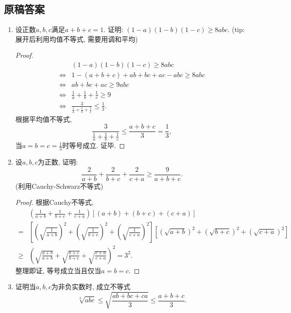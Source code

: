 \documentclass[UTF8,11pt, a4paper, oneside, fontset=none]{ctexbook}
\begin{document}
\subsection*{原稿答案}
\begin{enumerate}

\item 设正数$a, b, c$满足$a + b + c =1$. 证明: $(1-a)(1-b)(1-c) \geq 8abc$. (tip: 展开后利用均值不等式, 需要用调和平均)

\begin{proof}

\begin{align*}
& (1-a)(1-b)(1-c) \geq 8abc \\
\Leftrightarrow & 1 - (a + b + c) + ab + bc + ac - abc \geq 8abc\\
\Leftrightarrow & ab + bc + ac  \geq 9abc\\
\Leftrightarrow & \frac{1}{a} + \frac{1}{b} + \frac{1}{c} \geq 9\\
\Leftrightarrow & \frac{3}{ \frac{1}{a} + \frac{1}{b} + \frac{1}{c}} \leq \frac{1}{3}.
\end{align*}
根据平均值不等式,
\[
\frac{3}{ \frac{1}{a} + \frac{1}{b} + \frac{1}{c}} \leq \frac{a + b + c}{3} = \frac{1}{3},
\]
当$a = b = c =\frac{1}{3}$时等号成立. 证毕.

\end{proof}

\item 设$a, b, c$为正数, 证明:
\[
\frac{2}{a + b} + \frac{2}{b + c} + \frac{2}{c + a} \geq \frac{9}{a + b + c}.
\]
(利用Cauchy-Schwarz不等式)

\begin{proof}

根据Cauchy不等式, 
\begin{align*}
& \left( \frac{1}{a + b} + \frac{1}{b + c} + \frac{1}{c + a} \right)[(a+b) + (b+c) + (c+a)] \\
= &  \left[ \left(\sqrt{ \frac{1}{a + b}}\right)^2 + \left(\sqrt{ \frac{1}{b + c}}\right)^2 + \left(\sqrt{ \frac{1}{c + a}}\right)^2 \right]  [(\sqrt{a+b})^2 + (\sqrt{b+c})^2 + (\sqrt{c+a})^2] \\
\geq & \left( \sqrt{\frac{a+b}{a+b}} + \sqrt{\frac{b+c}{b+c}} + \sqrt{\frac{c+a}{c+a}} \right)^2 = 3^2.
\end{align*}
整理即证, 等号成立当且仅当$a = b = c$.

\end{proof}

\item 证明当$a, b, c$为非负实数时, 成立不等式
\[
\sqrt[3]{abc} \leq \sqrt{\frac{ab + bc + ca}{3}} \leq \frac{a+b+c}{3}.
\]


\end{enumerate}
\end{document}
